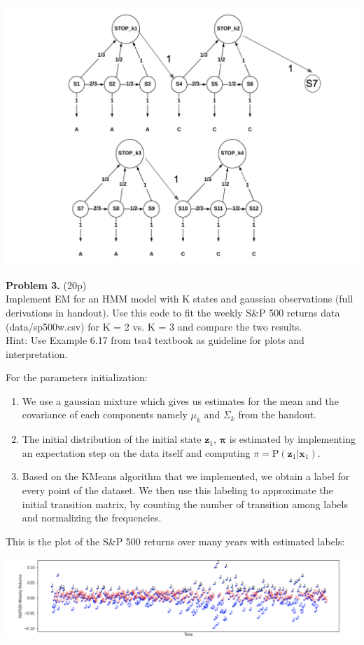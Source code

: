 \documentclass[12pt]{article}
\newcommand{\p}[1]{\mathrm{P}\left(#1 \right)}
\newcommand{\vect}[1]{\mathbf{#1}}
\begin{document}
\begin{center}
	\includegraphics[width=1\linewidth]{figures/problem-2-2.png} 
\end{center}


\noindent \textbf{Problem 3.}  (20p)\\ 
Implement EM for an HMM model with K states and gaussian observations (full derivations in handout). 
Use this code to fit the weekly S\&P 500 returns data (data/sp500w.csv) for K = 2 vs. K = 3 and compare the two results. \\
Hint: Use Example 6.17 from tsa4 textbook as guideline for plots and interpretation.


For the parameters initialization:
\begin{enumerate}
	\item We use a gaussian mixture which gives us estimates for the mean and the covariance of each components namely $\mu_k$ and $\Sigma_k$ from
the handout.
	\item  The initial distribution of the initial state $\vect{z}_1$, $\vect{\pi}$ is estimated by implementing an expectation step on the data itself and computing $\pi=\p{\vect{z}_1|\vect{x}_1}$. 
	\item Based on the KMeans algorithm that we implemented, we obtain a label for every point of the dataset. We then use this labeling to approximate the initial transition matrix, by counting the number of transition among labels 
and normalizing the frequencies.
\end{enumerate}

This is the plot of the S\&P 500 returns over many years with estimated labels:
\begin{center}
	\includegraphics[width=1\linewidth]{figures/problem-3-1.png} 
\end{center}
\end{document}
